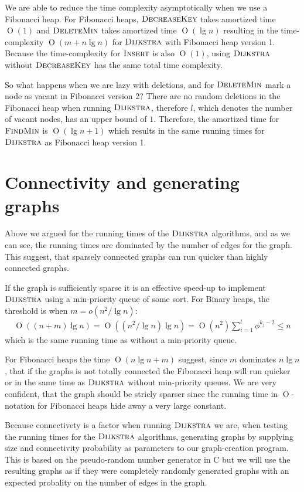 \documentclass[oneside,11pt,openright]{report}
\newcommand{\BigO}[1]{\ensuremath{\operatorname{O}\left(#1\right)}}
\newcommand{\FindMin}{\textsc{FindMin}}
\newcommand{\Insert}{\textsc{Insert}}
\newcommand{\DeleteMin}{\textsc{DeleteMin}}
\newcommand{\DecreaseKey}{\textsc{DecreaseKey}}
\newcommand{\Dijkstra}{\textsc{Dijkstra}}
\begin{document}
We are able to reduce the time complexity asymptotically when we use a Fibonacci heap. For Fibonacci heaps, $\DecreaseKey $ takes amortized time $\BigO{1}$ and $\DeleteMin$ takes amortized time $\BigO{\lg n}$ resulting in the time-complexity $\BigO{m+n\lg n}$ for $\Dijkstra$ with Fibonacci heap version 1. Because the time-complexity for $\Insert$ is also $\BigO{1}$, using $\Dijkstra$ without $\DecreaseKey$ has the same total time complexity.

So what happens when we are lazy with deletions, and for $\DeleteMin$ mark a node as vacant in Fibonacci version 2? There are no random deletions in the Fibonacci heap when running $\Dijkstra$, therefore $l$, which denotes the number of vacant nodes, has an upper bound of $1$. Therefore, the amortized time for $\FindMin$ is $\BigO{\lg n + 1}$ which results in the same running times for $\Dijkstra$ as Fibonacci heap version 1.

\section{Connectivity and generating graphs}

Above we argued for the running times of the $\Dijkstra$ algorithms, and as we can see, the running times are dominated by the number of edges for the graph. This suggest, that sparsely connected graphs can run quicker than highly connected graphs.

If the graph is sufficiently sparse it is an effective speed-up to implement $\Dijkstra$ using a min-priority queue of some sort. For Binary heaps, the threshold is when $m = o(n^2 / \lg n)$:
\begin{align*}
    \BigO{(n+m)\lg n} = \BigO{(n^2/\lg n)\lg n} = \BigO{n^2}
\sum_{i=1}^l \phi^{k_j-2} \le n
 \end{align*}
 which is the same running time as without a min-priority queue.
 
For Fibonacci heaps the time $\BigO{n\lg n + m}$ suggest, since $m$ dominates $n \lg n$, that if the graphs is not totally connected the Fibonacci heap will run quicker or in the same time as $\Dijkstra$ without min-priority queues. We are very confident, that the graph should be stricly sparser since the running time in $\operatorname{O}$-notation for Fibonacci heaps hide away a very large constant.

Because connectivety is a factor when running $\Dijkstra$ we are, when testing the running times for the $\Dijkstra$ algorithms, generating graphs by supplying size and connectivity probability as parameters to our graph-creation program. This is based on the pseudo-random number generator in C but we will use the resulting graphs as if they were completely randomly generated graphs with an expected probality on the number of edges in the graph.
\end{document}
